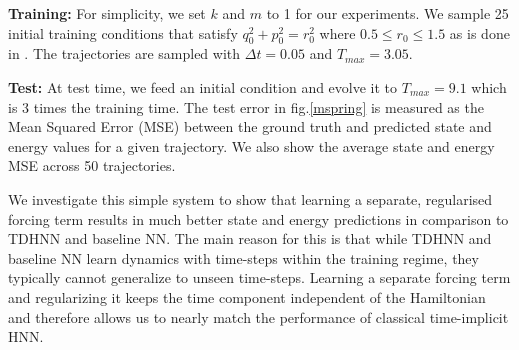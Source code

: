 \documentclass[twoside]{article}
\begin{document}
\textbf{Training:} For simplicity, we set $k$ and $m$ to 1 for our experiments. We sample 25 initial training conditions that satisfy $q_0^2+p_0^2 = r_0^2$ where $0.5 \leq r_0 \leq 1.5$ as is done in \cite{greydanus_hamiltonian_2019}. The trajectories are sampled with $\Delta t =0.05$ and $T_{max} = 3.05$.  

\textbf{Test:} At test time, we feed an initial condition and evolve it to $T_{max}=9.1$ which is 3 times the training time. The test error in fig.\ref{mspring} is measured as the Mean Squared Error (MSE) between the ground truth and predicted state and energy values for a given trajectory. We also show the average state and energy MSE  across 50 trajectories. 

We investigate this simple system to show that learning a separate, regularised forcing term results in much better state and energy predictions in comparison to TDHNN and baseline NN. The main reason for this is that while TDHNN and baseline NN learn dynamics with time-steps within the training regime, they typically cannot generalize to unseen time-steps. Learning a separate forcing term and regularizing it keeps the time component independent of the Hamiltonian and therefore allows us to nearly match the performance of classical time-implicit HNN.
\end{document}
